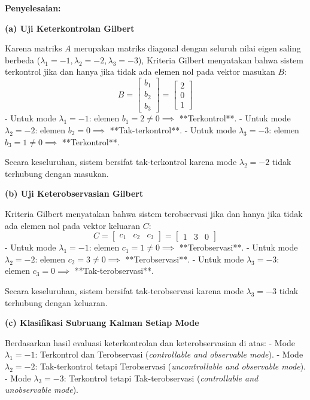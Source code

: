 \documentclass[11pt,a4paper]{article}
\begin{document}
\textbf{Penyelesaian:}

\textbf{(a) Uji Keterkontrolan Gilbert}

Karena matriks $A$ merupakan matriks diagonal dengan seluruh nilai eigen saling berbeda ($\lambda_1 = -1, \lambda_2 = -2, \lambda_3 = -3$), Kriteria Gilbert menyatakan bahwa sistem terkontrol jika dan hanya jika tidak ada elemen nol pada vektor masukan $B$:
$$B = \begin{bmatrix} b_1 \\ b_2 \\ b_3 \end{bmatrix} = \begin{bmatrix} 2 \\ 0 \\ 1 \end{bmatrix}$$
- Untuk mode $\lambda_1 = -1$: elemen $b_1 = 2 \ne 0 \implies$ **Terkontrol**.
- Untuk mode $\lambda_2 = -2$: elemen $b_2 = 0 \implies$ **Tak-terkontrol**.
- Untuk mode $\lambda_3 = -3$: elemen $b_3 = 1 \ne 0 \implies$ **Terkontrol**.

Secara keseluruhan, sistem bersifat tak-terkontrol karena mode $\lambda_2 = -2$ tidak terhubung dengan masukan.

\textbf{(b) Uji Keterobservasian Gilbert}

Kriteria Gilbert menyatakan bahwa sistem terobservasi jika dan hanya jika tidak ada elemen nol pada vektor keluaran $C$:
$$C = \begin{bmatrix} c_1 & c_2 & c_3 \end{bmatrix} = \begin{bmatrix} 1 & 3 & 0 \end{bmatrix}$$
- Untuk mode $\lambda_1 = -1$: elemen $c_1 = 1 \ne 0 \implies$ **Terobservasi**.
- Untuk mode $\lambda_2 = -2$: elemen $c_2 = 3 \ne 0 \implies$ **Terobservasi**.
- Untuk mode $\lambda_3 = -3$: elemen $c_3 = 0 \implies$ **Tak-terobservasi**.

Secara keseluruhan, sistem bersifat tak-terobservasi karena mode $\lambda_3 = -3$ tidak terhubung dengan keluaran.

\textbf{(c) Klasifikasi Subruang Kalman Setiap Mode}

Berdasarkan hasil evaluasi keterkontrolan dan keterobservasian di atas:
- Mode $\lambda_1 = -1$: Terkontrol dan Terobservasi (\textit{controllable and observable mode}).
- Mode $\lambda_2 = -2$: Tak-terkontrol tetapi Terobservasi (\textit{uncontrollable and observable mode}).
- Mode $\lambda_3 = -3$: Terkontrol tetapi Tak-terobservasi (\textit{controllable and unobservable mode}).
\end{document}
